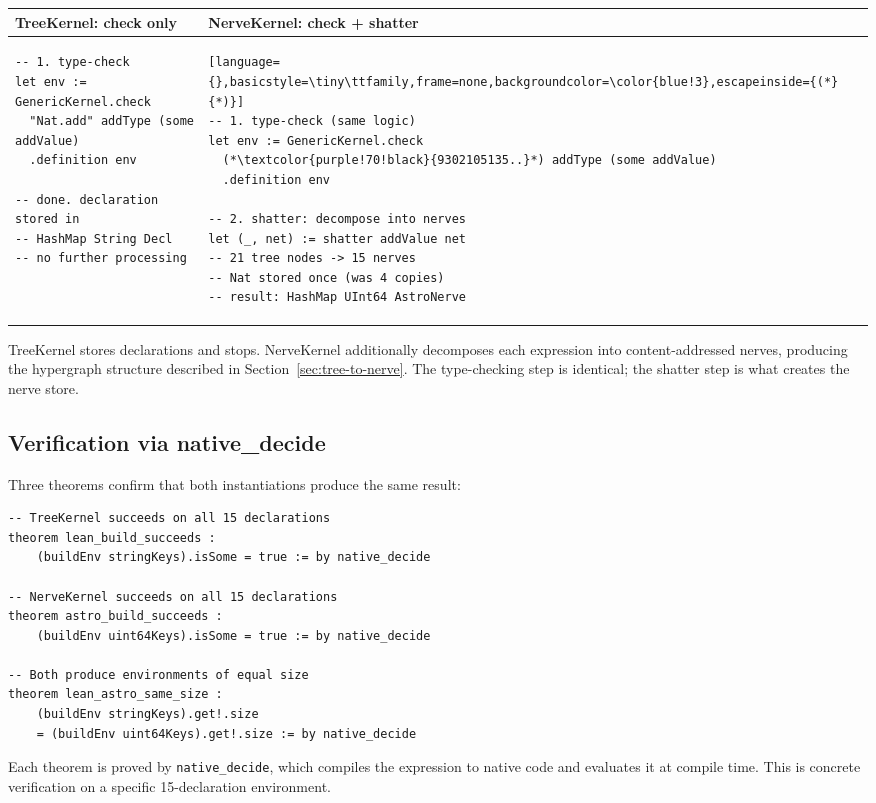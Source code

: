 \begin{center}\small
\begin{tabular}{@{}p{}p{}@{}}
\toprule
\textbf{TreeKernel: check only} & \textbf{NerveKernel: check + shatter} \\
\midrule
\begin{lstlisting}[language={},basicstyle=\tiny\ttfamily,frame=none,backgroundcolor=\color{green!3}]
-- 1. type-check
let env := GenericKernel.check
  "Nat.add" addType (some addValue)
  .definition env

-- done. declaration stored in
-- HashMap String Decl
-- no further processing
\end{lstlisting}
&
\begin{lstlisting}[language={},basicstyle=\tiny\ttfamily,frame=none,backgroundcolor=\color{blue!3},escapeinside={(*}{*)}]
-- 1. type-check (same logic)
let env := GenericKernel.check
  (*\textcolor{purple!70!black}{9302105135..}*) addType (some addValue)
  .definition env

-- 2. shatter: decompose into nerves
let (_, net) := shatter addValue net
-- 21 tree nodes -> 15 nerves
-- Nat stored once (was 4 copies)
-- result: HashMap UInt64 AstroNerve
\end{lstlisting}
\\
\bottomrule
\end{tabular}
\end{center}

TreeKernel stores declarations and stops.  NerveKernel additionally decomposes each expression into content-addressed nerves, producing the hypergraph structure described in Section~\ref{sec:tree-to-nerve}.  The type-checking step is identical; the shatter step is what creates the nerve store.

\subsection{Verification via native\_decide}

Three theorems confirm that both instantiations produce the same result:

\begin{lstlisting}[language={},morekeywords={theorem,by}]
-- TreeKernel succeeds on all 15 declarations
theorem lean_build_succeeds :
    (buildEnv stringKeys).isSome = true := by native_decide

-- NerveKernel succeeds on all 15 declarations
theorem astro_build_succeeds :
    (buildEnv uint64Keys).isSome = true := by native_decide

-- Both produce environments of equal size
theorem lean_astro_same_size :
    (buildEnv stringKeys).get!.size
    = (buildEnv uint64Keys).get!.size := by native_decide
\end{lstlisting}

Each theorem is proved by \texttt{native\_decide}, which compiles the expression to native code and evaluates it at compile time.  This is concrete verification on a specific 15-declaration environment.
